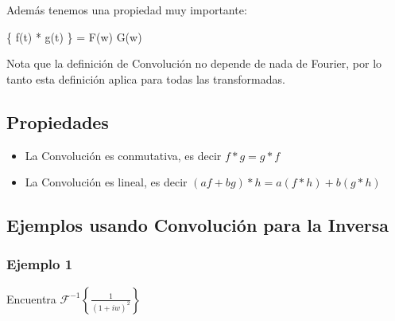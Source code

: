 \documentclass[12pt, fleqn]{report}                             %
\def \Eq {equation}                                             %
\newenvironment{MultiLineEquation*}[1]                          %
        {\begin{\Eq*}\begin{alignedat}{#1}}                         %
        {\end{alignedat}\end{\Eq*}}                                 %
\theoremstyle{break}                                            %
\newcommand{\FourierT}[1]   {\mathscr{F} \left\{ #1 \right\} }  %
\newcommand{\InvFourierT}[1]{\mathscr{F}^{-1}\left\{#1\right\}} %
\begin{document}
            Además tenemos una propiedad muy importante:
            \begin{MultiLineEquation*}{3}
                \FourierT{f(t) \;*\; g(t)} = F(w) \; G(w)
            \end{MultiLineEquation*}

            Nota que la definición de Convolución no depende de nada de Fourier, por lo tanto
            esta definición aplica para todas las transformadas.


                \subsection{Propiedades}

                    \begin{itemize}
                        \item La Convolución es conmutativa, es decir $f * g = g * f$
                        \item La Convolución es lineal, es decir $(af + bg)*h = a(f*h) + b(g*h)$
                    \end{itemize}



                \clearpage
                \subsection{Ejemplos usando Convolución para la Inversa}

                    \subsubsection{Ejemplo 1}

                    Encuentra $\InvFourierT{\frac{1}{(1+iw)^2}}$
\end{document}
